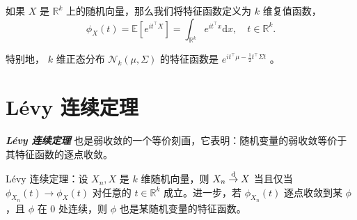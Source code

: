 \begin{definition}  
如果 $X$ 是 $\mathbb R^k$ 上的随机向量，那么我们将特征函数定义为 $k$ 维复值函数，
\[
\phi_X(t)=\mathbb{E}[e^{it^\top X}]=\int_{\mathbb R^k}e^{it^\top x}\mathrm d x,\quad t\in\mathbb R^k.
\]
\end{definition}


特别地， $k$ 维正态分布 $\mathcal{N}_k(\mu,\Sigma)$ 的特征函数是 $e^{it^\top\mu-\frac12t ^\top \Sigma t}$ 。

\section{Lévy 连续定理}

\textbf{\emph{Lévy 连续定理 }} 也是弱收敛的一个等价刻画，它表明：随机变量的弱收敛等价于其特征函数的逐点收敛。

\begin{theorem}\label{thm:ch2:levy-continuity}

Lévy 连续定理：设 $X_n,X$ 是 $k$ 维随机向量，则 $X_n\overset{\rm d}\to X$ 当且仅当 $\phi_{X_n}(t)\to \phi_{X}(t)$ 对任意的 $t\in\mathbb R^k$ 成立。进一步，若 $\phi_{X_n}(t)$ 逐点收敛到某 $\phi$，且 $\phi$ 在 0 处连续，则 $\phi$ 也是某随机变量的特征函数。

\end{theorem}

